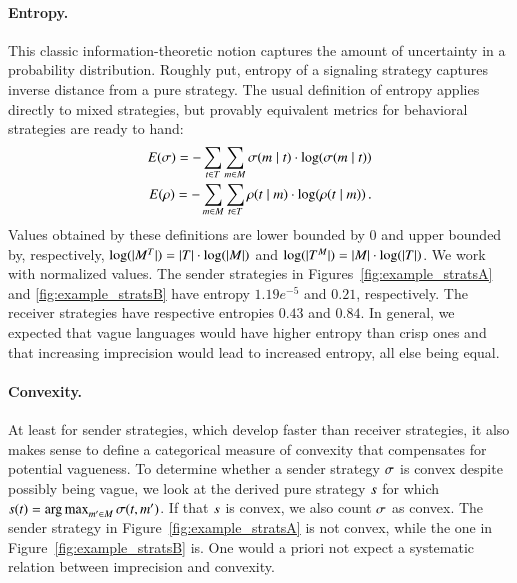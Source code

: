 \documentclass[fleqn,reqno,10pt]{article}
\begin{document}
\paragraph{Entropy.} This classic information-theoretic notion
captures the amount of uncertainty in a probability
distribution. Roughly put, entropy of a signaling strategy captures
inverse distance from a pure strategy. The usual definition of entropy
applies directly to mixed strategies, but provably equivalent metrics
for behavioral strategies are ready to hand:
\begin{align*}
  E(\sigma) = -\sum_{t \in T} \sum_{m \in M}
  \sigma(m \mid t) \cdot \log(\sigma(m \mid
  t)) \\
  E(\rho) = -\sum_{m \in M} \sum_{t \in T}
  \rho(t \mid m) \cdot \log(\rho(t \mid
  m)) \,. 
\end{align*}
Values obtained by these definitions are lower bounded by $0$ and
upper bounded by, respectively, $\log(|M^T|) = |T|
\cdot \log(|M|)$ and $\log(|T^M|) = |M| \cdot
\log(|T|)$. We work with normalized values. The sender
strategies in Figures~\ref{fig:example_stratsA} and
\ref{fig:example_stratsB} have entropy $1.19e^{-5}$ and $0.21$,
respectively. The receiver strategies have respective entropies $0.43$
and $0.84$. In general, we expected that vague languages would have
higher entropy than crisp ones and that increasing imprecision would
lead to increased entropy, all else being equal.

\paragraph{Convexity.} At least for sender strategies, which develop
faster than receiver strategies, it also makes sense to define a
categorical measure of convexity that compensates for potential
vagueness. To determine whether a sender strategy $\sigma$ is convex
despite possibly being vague, we look at the derived pure strategy
$s$ for which $s(t) = \operatorname*{arg\,max}_{m' \in M}
\sigma(t,m')$. If that $s$ is convex, we also count
$\sigma$ as convex. The sender strategy in
Figure~\ref{fig:example_stratsA} is not convex, while the one in
Figure~\ref{fig:example_stratsB} is.  One would a priori not expect a
systematic relation between imprecision and convexity.
\end{document}
